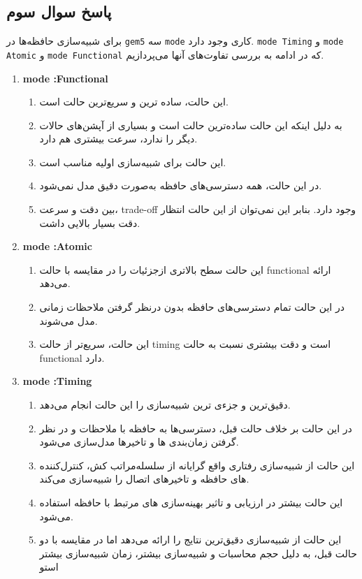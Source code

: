 \documentclass[12pt]{exam}
\begin{document}
\begin{multicols}{1}
	
	
	\section{پاسخ سوال سوم}
	برای شبیه‌سازی حافظه‌ها در \texttt{gem5} سه \texttt{mode} کاری وجود دارد. \texttt{mode Timing} و \texttt{mode Atomic} و \texttt{mode Functional} که در ادامه به بررسی تفاوت‌های آنها می‌پردازیم.

	\begin{enumerate}
		
		\item \textbf{mode :Functional }
		\begin{enumerate}
			\item این حالت، ساده ترین و سریع‌ترین حالت است.
			\item به دلیل اینکه این حالت ساده‌ترین حالت است و بسیاری از آپشن‌های حالات دیگر را ندارد، سرعت بیشتری هم دارد.
			\item این حالت برای شبیه‌سازی اولیه مناسب است.
			\item در این حالت، همه دسترسی‌های حافظه به‌صورت دقیق مدل نمی‌شود.
			‌\item بین دقت و سرعت، trade-off وجود دارد. بنابر این نمی‌توان از این حالت انتظار دقت بسیار بالایی داشت.
		\end{enumerate}
		
		
		\item \textbf{mode :Atomic }
		\begin{enumerate}
			\item این حالت سطح بالا‌تری ازجزئیات را در مقایسه با حالت functional ارائه می‌دهد.
			\item در این حالت تمام دسترسی‌های حافظه بدون درنظر گرفتن ملاحظات زمانی مدل می‌شوند.
			\item این حالت، سریع‌تر از حالت timing است و دقت بیشتری نسبت به حالت functional دارد.
		\end{enumerate}
		
		
		
		
		
		\item \textbf{mode :Timing }
		\begin{enumerate}
			\item دقیق‌ترین و جزءی ترین شبیه‌سازی را این حالت انجام می‌دهد.
			\item در این حالت بر خلاف حالت قبل، دسترسی‌ها به حافظه با ملاحظات و در نظر گرفتن زمان‌بندی ها و تاخیر‌ها مدل‌سازی می‌شود.
			\item این حالت از شبیه‌سازی رفتاری واقع گرایانه از سلسله‌مراتب کش، کنترل‌کننده های حافظه و تاخیر‌های اتصال را شبیه‌سازی می‌کند.
			\item این حالت بیشتر در ارزیابی و تاثیر بهینه‌سازی های مرتبط با حافظه استفاده می‌شود.
			\item این حالت از شبیه‌سازی دقیق‌ترین نتایج را ارائه می‌دهد اما در مقایسه با دو حالت قبل، به دلیل حجم محاسبات و شبیه‌سازی بیشتر، زمان‌ شبیه‌سازی بیشتر استو	
		\end{enumerate}
		

\end{enumerate}
\end{multicols}
\end{document}
